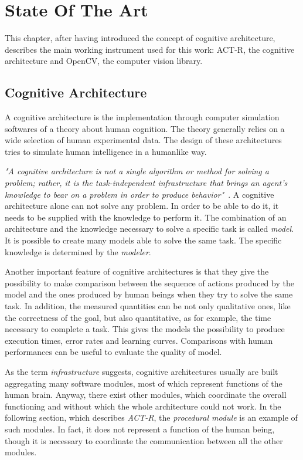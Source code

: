 \chapter{State Of The Art}
  This chapter, after having introduced the concept of cognitive architecture, describes the main working instrument used for this work: \mbox{ACT-R,} the cognitive architecture and \mbox{OpenCV,} the computer vision library. 
  \section{Cognitive Architecture}	
	A cognitive architecture is the implementation through computer simulation softwares  of a theory about human cognition. The theory generally relies on a wide selection of human experimental data. The design of these architectures tries to simulate human intelligence in a humanlike way.
	
	\textit{"A cognitive architecture is not a single algorithm or method for solving a problem; rather, it is the task-independent infrastructure that brings an agent’s knowledge to bear on a problem in order to produce behavior"}~\cite{SoarCogArch2012}. A cognitive architecture alone can not solve any problem. In order to be able to do it, it needs to be supplied with the knowledge to perform it. The combination of an architecture and the knowledge necessary to solve a specific task is called \emph{model}. It is possible to create many models able to solve the same task. The specific knowledge is determined by the \emph{modeler}. ~\cite{Sears2012}
	
	Another important feature of cognitive architectures is that they give the possibility to make comparison between the sequence of actions produced by the model and the ones produced by human beings when they try to solve the same task. In addition, the measured quantities can be not only qualitative ones, like the correctness of the goal, but also quantitative, as for example, the time necessary to complete a task. This gives the models the possibility to produce execution times, error rates and learning curves. Comparisons with human performances can be useful to evaluate the quality of model. ~\cite{Sears2012}
	
	As the term \emph{infrastructure} suggests, cognitive architectures usually are built aggregating many software modules, most of which represent functions of the human brain. Anyway, there exist other modules, which coordinate the overall functioning and without which the whole architecture could not work. In the following section, which describes \emph{ACT-R}, the \emph{procedural module} is an example of such modules. In fact, it does not represent a function of the human being, though it is necessary to coordinate the communication between all the other modules. 
	
